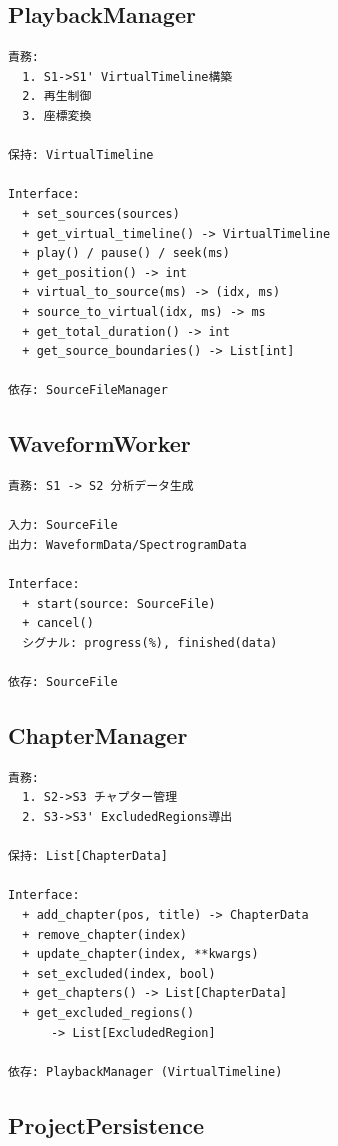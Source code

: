 \documentclass[10pt,a4paper,twocolumn]{ltjsarticle}
\begin{document}
\subsection{PlaybackManager}

\begin{lstlisting}
責務:
  1. S1->S1' VirtualTimeline構築
  2. 再生制御
  3. 座標変換

保持: VirtualTimeline

Interface:
  + set_sources(sources)
  + get_virtual_timeline() -> VirtualTimeline
  + play() / pause() / seek(ms)
  + get_position() -> int
  + virtual_to_source(ms) -> (idx, ms)
  + source_to_virtual(idx, ms) -> ms
  + get_total_duration() -> int
  + get_source_boundaries() -> List[int]

依存: SourceFileManager
\end{lstlisting}

\subsection{WaveformWorker}

\begin{lstlisting}
責務: S1 -> S2 分析データ生成

入力: SourceFile
出力: WaveformData/SpectrogramData

Interface:
  + start(source: SourceFile)
  + cancel()
  シグナル: progress(%), finished(data)

依存: SourceFile
\end{lstlisting}

\subsection{ChapterManager}

\begin{lstlisting}
責務:
  1. S2->S3 チャプター管理
  2. S3->S3' ExcludedRegions導出

保持: List[ChapterData]

Interface:
  + add_chapter(pos, title) -> ChapterData
  + remove_chapter(index)
  + update_chapter(index, **kwargs)
  + set_excluded(index, bool)
  + get_chapters() -> List[ChapterData]
  + get_excluded_regions()
      -> List[ExcludedRegion]

依存: PlaybackManager (VirtualTimeline)
\end{lstlisting}

\subsection{ProjectPersistence}
\end{document}
